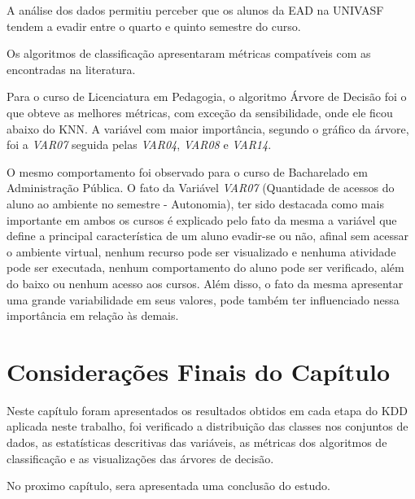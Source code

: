 A análise dos dados permitiu perceber que os alunos da EAD na UNIVASF tendem a evadir entre o quarto e quinto semestre do curso.

Os algoritmos de classificação apresentaram métricas compatíveis com as encontradas na literatura.

Para o curso de Licenciatura em Pedagogia, o algoritmo Árvore de Decisão foi o
que obteve as melhores métricas, com exceção da sensibilidade, onde ele ficou
abaixo do KNN. A variável com maior importância, segundo o gráfico da árvore,
foi a \textit{VAR07} seguida pelas \textit{VAR04}, \textit{VAR08} e
\textit{VAR14}.

O mesmo comportamento foi observado para o curso de Bacharelado em Administração
Pública.
O fato da Variável \textit{VAR07} (Quantidade de acessos do aluno ao ambiente no semestre - Autonomia),
ter sido destacada como mais importante em ambos os cursos é explicado pelo fato da mesma a variável que define a principal
característica de um aluno evadir-se ou não, afinal sem acessar o ambiente virtual, nenhum recurso
pode ser visualizado e nenhuma atividade pode ser executada, nenhum comportamento do aluno pode ser verificado, além do baixo
ou nenhum acesso aos cursos.
Além disso, o fato da mesma apresentar uma grande variabilidade em seus valores, pode também ter
influenciado nessa importância em relação às demais.

\section{Considerações Finais do Capítulo}

Neste capítulo foram apresentados os resultados obtidos em cada etapa do KDD
aplicada neste trabalho, foi verificado a distribuição das classes nos conjuntos
de dados, as estatísticas descritivas das variáveis, as métricas dos algoritmos
de classificação e as visualizações das árvores de decisão.

No proximo capítulo, sera apresentada uma conclusão do estudo.
